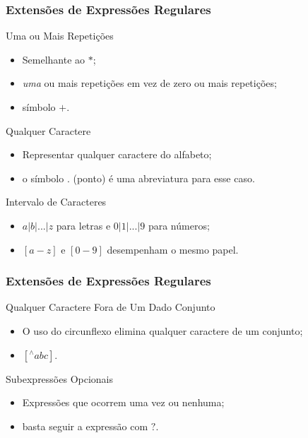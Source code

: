 \documentclass[table]{beamer}
\begin{document}
\begin{frame}
   \frametitle{Extensões de Expressões Regulares}
   \begin{block}{Uma ou Mais Repetições}
      \begin{itemize}
         \item Semelhante ao $*$;
	 \item \textit{uma} ou mais repetições em vez de zero ou mais repetições;
	 \item símbolo $+$.
      \end{itemize}
   \end{block}
   \begin{block}{Qualquer Caractere}
      \begin{itemize}
         \item Representar qualquer caractere do alfabeto;
	 \item o símbolo $.$ (ponto) é uma abreviatura para esse caso.
      \end{itemize}
   \end{block}
   \begin{block}{Intervalo de Caracteres}
      \begin{itemize}
         \item $a|b|...|z$ para letras e $0|1|...|9$ para números;
	 \item $[a-z]$ e $[0-9]$ desempenham o mesmo papel.
      \end{itemize}
   \end{block}
\end{frame}

\begin{frame}
   \frametitle{Extensões de Expressões Regulares}
   \begin{block}{Qualquer Caractere Fora de Um Dado Conjunto}
      \begin{itemize}
         \item O uso do circunflexo elimina qualquer caractere de um conjunto;
	 \item $[^\wedge abc]$.
      \end{itemize}
   \end{block}
   \begin{block}{Subexpressões Opcionais}
      \begin{itemize}
         \item Expressões que ocorrem uma vez ou nenhuma;
	 \item basta seguir a expressão com $?$.
      \end{itemize}
   \end{block}
\end{frame}
\end{document}
